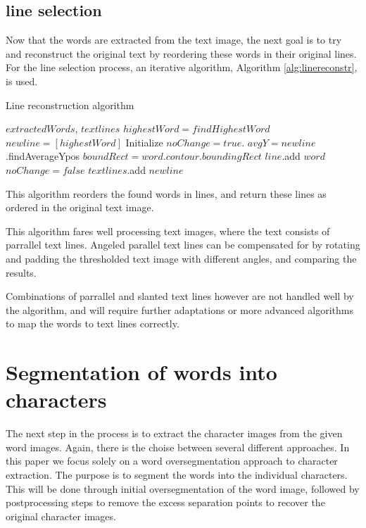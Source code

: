 \documentclass{article}
\begin{document}
\vspace{-20px}
\subsection{line selection}
Now that the words are extracted from the text image, the next goal is to try and reconstruct the original text by reordering these words in their original lines.
For the line selection process, an iterative algorithm, Algorithm \ref{alg:linereconstr}, is used.
\begin{algorithm}[tb]
   \caption{Line reconstruction algorithm}
   \label{alg:linereconstr}
\begin{algorithmic}
    $extractedWords$, $textlines$
   \REPEAT
        \STATE $highestWord = findHighestWord $
        \STATE $newline = [highestWord]$
        \STATE Initialize $noChange = true$.
        \STATE $avgY= newline$.findAverageYpos
        \REPEAT
            \STATE $boundRect = word.contour.boundingRect$
            \STATE $line$.add $word$
            \STATE $noChange = false$
            \ENDIF
        \ENDFOR
        \STATE $textlines$.add $newline$
\end{algorithmic}
\end{algorithm}

This algorithm reorders the found words in lines, and return these lines as ordered in the original text image.

This algorithm fares well processing text images, where the text consists of parrallel text lines.
Angeled parallel text lines can be compensated for by rotating and padding the thresholded text image with different angles, and comparing the results.

Combinations of parrallel and slanted text lines however are not handled well by the algorithm, and will require further adaptations or more advanced algorithms to map the words to text lines correctly.


\section{Segmentation of words into characters}
\label{sec:segword}

The next step in the process is to extract the character images from the given word images.
Again, there is the choise between several different approaches.
In this paper we focus solely on a word oversegmentation approach to character extraction.
The purpose is to segment the words into the individual characters.
This will be done through initial oversegmentation of the word image, followed by postprocessing steps to remove the excess separation points to recover the original character images.
\end{document}
